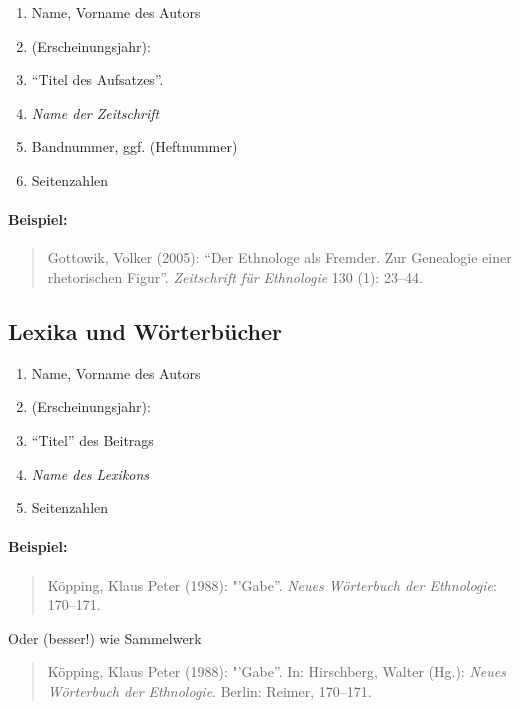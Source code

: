 \documentclass[ 12pt,
                titlepage,
                parskip=half,
                version=first,
                bibliography=totocnumbered,
                final,
                listof=totoc]{scrartcl}
\begin{document}
\begin{samepage}
\begin{enumerate}
    \item Name, Vorname des Autors
    \item (Erscheinungsjahr):
    \item \enquote{Titel des Aufsatzes}.
    \item \emph{Name der Zeitschrift}
    \item Bandnummer, ggf. (Heftnummer)
    \item Seitenzahlen
\end{enumerate}
\end{samepage}

\paragraph{Beispiel:}
\begin{quote}
Gottowik, Volker (2005): \enquote{Der Ethnologe als Fremder. Zur Genealogie
einer rhetorischen Figur}. \emph{Zeitschrift für Ethnologie} 130 (1): 23--44.
\end{quote}

\subsection{Lexika und Wörterbücher}
\label{sec:sub_lexika_and_wörterbuch}

\begin{enumerate}
    \item Name, Vorname des Autors
    \item (Erscheinungsjahr):
    \item \enquote{Titel} des Beitrags
    \item \emph{Name des Lexikons}
    \item Seitenzahlen
\end{enumerate}

\paragraph{Beispiel:}
\begin{quote}
Köpping, Klaus Peter (1988): "'Gabe”. \emph{Neues Wörterbuch der Ethnologie}:
170--171.
\end{quote}

Oder (besser!) wie Sammelwerk

\begin{quote}
Köpping, Klaus Peter (1988): "'Gabe”. In: Hirschberg, Walter (Hg.): \emph{Neues
Wörterbuch der Ethnologie}. Berlin: Reimer, 170--171.
\end{quote}
\end{document}
